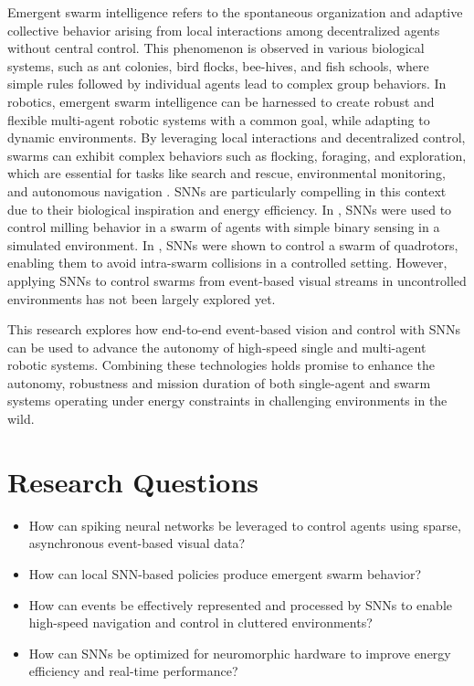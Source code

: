 \documentclass{article}
\begin{document}
Emergent swarm intelligence refers to the spontaneous organization and adaptive collective behavior arising from local interactions among decentralized agents without central control. This phenomenon is observed in various biological systems, such as ant colonies, bird flocks, bee-hives, and fish schools, where simple rules followed by individual agents lead to complex group behaviors. In robotics, emergent swarm intelligence can be harnessed to create robust and flexible multi-agent robotic systems with a common goal, while adapting to dynamic environments. By leveraging local interactions and decentralized control, swarms can exhibit complex behaviors such as flocking, foraging, and exploration, which are essential for tasks like search and rescue, environmental monitoring, and autonomous navigation \cite{debieSwarmRoboticsSurvey2023}. SNNs are particularly compelling in this context due to their biological inspiration and energy efficiency. In \cite{zhuSpikingNeuralNetworks2024}, SNNs were used to control milling behavior in a swarm of agents with simple binary sensing in a simulated environment. In \cite{zhaoNatureinspiredSelforganizingCollision2022}, SNNs were shown to control a swarm of quadrotors, enabling them to avoid intra-swarm collisions in a controlled setting. However, applying SNNs to control swarms from event-based visual streams in uncontrolled environments has not been largely explored yet. 

This research explores how end-to-end event-based vision and control with SNNs can be used to advance the autonomy of high-speed single and multi-agent robotic systems. Combining these technologies holds promise to enhance the autonomy, robustness and mission duration of both single-agent and swarm systems operating under energy constraints in challenging environments in the wild.

\section{Research Questions}
\begin{itemize}
    \item How can spiking neural networks be leveraged to control agents using sparse, asynchronous event-based visual data?
    \item How can local SNN-based policies produce emergent swarm behavior?
    \item How can events be effectively represented and processed by SNNs to enable high-speed navigation and control in cluttered environments?
    \item How can SNNs be optimized for neuromorphic hardware to improve energy efficiency and real-time performance?
\end{itemize}
\end{document}
